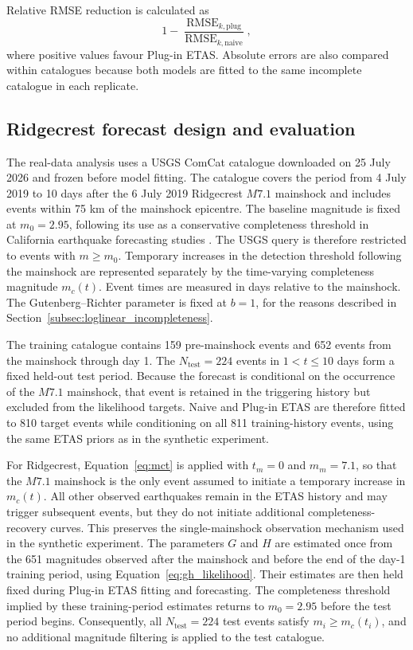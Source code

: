 \documentclass{statsmsc}
\begin{document}
Relative RMSE reduction is calculated as
\[
1-
\frac{\operatorname{RMSE}_{k,\mathrm{plug}}}
{\operatorname{RMSE}_{k,\mathrm{naive}}},
\]
where positive values favour Plug-in ETAS. Absolute errors are also compared
within catalogues because both models are fitted to the same incomplete
catalogue in each replicate.

\subsection{Ridgecrest forecast design and evaluation}
\label{subsec:ridgecrest_design}

The real-data analysis uses a USGS ComCat catalogue downloaded on 25 July
2026 and frozen before model fitting. The catalogue covers the period from
4 July 2019 to 10 days after the 6 July 2019 Ridgecrest \(M7.1\) mainshock
and includes events within 75 km of the mainshock epicentre. The baseline
magnitude is fixed at \(m_0=2.95\), following its use as a conservative
completeness threshold in California earthquake forecasting studies
\citep{nandan2019}. The USGS query is therefore restricted to events with
\(m\geq m_0\). Temporary increases in the detection threshold following the
mainshock are represented separately by the time-varying completeness
magnitude \(m_c(t)\). Event times are measured in days relative to the
mainshock. The Gutenberg--Richter parameter is fixed at \(b=1\), for the
reasons described in Section~\ref{subsec:loglinear_incompleteness}.

The training catalogue contains 159 pre-mainshock events and 652 events from
the mainshock through day 1. The \(N_{\mathrm{test}}=224\) events in
\(1<t\leq10\) days form a fixed held-out test period. Because the forecast is
conditional on the occurrence of the \(M7.1\) mainshock, that event is
retained in the triggering history but excluded from the likelihood targets.
Naive and Plug-in ETAS are therefore fitted to 810 target events while
conditioning on all 811 training-history events, using the same ETAS priors
as in the synthetic experiment.

For Ridgecrest, Equation~\eqref{eq:mct} is applied with \(t_m=0\) and
\(m_m=7.1\), so that the \(M7.1\) mainshock is the only event assumed to
initiate a temporary increase in \(m_c(t)\). All other observed earthquakes
remain in the ETAS history and may trigger subsequent events, but they do not
initiate additional completeness-recovery curves. This preserves the
single-mainshock observation mechanism used in the synthetic experiment.
The parameters \(G\) and \(H\) are estimated once from the 651 magnitudes
observed after the mainshock and before the end of the day-1 training period,
using Equation~\eqref{eq:gh_likelihood}. Their estimates are then held fixed
during Plug-in ETAS fitting and forecasting. The completeness threshold
implied by these training-period estimates returns to \(m_0=2.95\) before
the test period begins. Consequently, all \(N_{\mathrm{test}}=224\) test
events satisfy \(m_i\geq m_c(t_i)\), and no additional magnitude filtering
is applied to the test catalogue.
\end{document}
